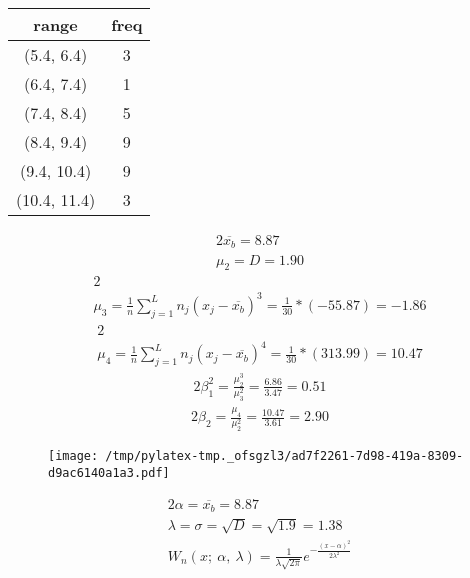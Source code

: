 \documentclass{article}%
\begin{document}
%
\normalsize%
\begin{tabular}{c|c}
\toprule
       range &  freq \\
\midrule
  (5.4, 6.4) &     3 \\
  (6.4, 7.4) &     1 \\
  (7.4, 8.4) &     5 \\
  (8.4, 9.4) &     9 \\
 (9.4, 10.4) &     9 \\
(10.4, 11.4) &     3 \\
\bottomrule
\end{tabular}
%
\begin{alignat*}{2}%
\overline {{ x_{{b}} }} = 8.87%
\\ \mu_2 = D = 1.90%
\end{alignat*}%
\begin{alignat*}{2}%
\\ \mu_3
            = \frac 1 n \sum\limits_{j = 1}^L {n_j (x_j - \overline {{ x_{{b}} }})^3}
            = \frac 1 { 30 } * (-55.87)
            = -1.86
\end{alignat*}%
\begin{alignat*}{2}%
\\ \mu_4
            = \frac 1 n \sum\limits_{j = 1}^L {n_j (x_j - \overline {{ x_{{b}} }})^4}
            = \frac 1 { 30 } * (313.99)
            = 10.47
\end{alignat*}%
\begin{alignat*}{2}%
\beta_1^2
            = \frac {\mu_2^3} {\mu_3^2}
            = \frac {6.86} {3.47}
            = 0.51
\end{alignat*}%
\begin{alignat*}{2}%
\beta_2
            = \frac {\mu_4} {\mu_2^2}
            = \frac {10.47} {3.61}
            = 2.90
\end{alignat*}%


\begin{figure}[H]%
\centering%
\texttt{[image: /tmp/pylatex-tmp.\_ofsgzl3/ad7f2261-7d98-419a-8309-d9ac6140a1a3.pdf]}%
\end{figure}

%
\begin{alignat*}{2}%
\alpha = \overline {{ x_{{b}} }} = 8.87%
\\ \lambda
            = \sigma
            = \sqrt D
            = \sqrt {1.9}
            = 1.38
\\ W_n(x; ~ \alpha, ~ \lambda) = \frac 1 {{\lambda \sqrt {{2 \pi}} }}
            e^{{ - \frac {{(x - \alpha)^2}} {{2 \lambda^2}} }}%
\end{alignat*}%
\end{document}
